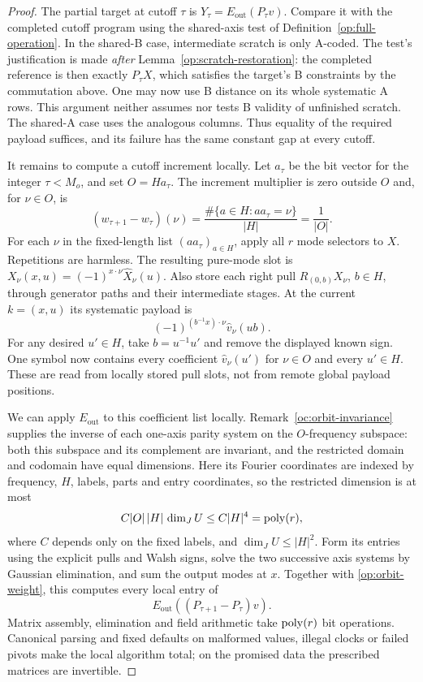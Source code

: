 \begin{proof}
The partial target at cutoff $\tau$ is
$Y_\tau=E_{\mathrm{out}}(P_\tau v)$.
Compare it with the completed cutoff program using the shared-axis
test of Definition~\ref{op:full-operation}.  In the shared-B case,
intermediate scratch is only A-coded.  The test's justification is
made \emph{after} Lemma~\ref{op:scratch-restoration}: the completed
reference is then exactly $P_\tau X$, which satisfies the target's
B constraints by the commutation above.  One may now use B distance
on its whole systematic A rows.  This argument neither assumes nor
tests B validity of unfinished scratch.  The shared-A case uses the
analogous columns.  Thus equality of the required payload suffices,
and its failure has the same constant gap at every cutoff.

It remains to compute a cutoff increment locally.  Let $a_\tau$ be
the bit vector for the integer $\tau<M_o$, and set $O=Ha_\tau$.
The increment multiplier is zero outside $O$ and, for $\nu\in O$, is
\begin{equation}\label{op:orbit-weight}
 (w_{\tau+1}-w_\tau)(\nu)
 =\frac{\#\{a\in H:aa_\tau=\nu\}}{|H|}
 =\frac1{|O|}.
\end{equation}
For each $\nu$ in the fixed-length list $(aa_\tau)_{a\in H}$,
apply all $r$ mode selectors to $X$.  Repetitions are harmless.
The resulting pure-mode slot is
$X_\nu(x,u)=(-1)^{x\cdot\nu}\widehat X_\nu(u)$.
Also store each right pull $R_{(0,b)}X_\nu$, $b\in H$, through
generator paths and their intermediate stages.  At the current
$k=(x,u)$ its systematic payload is
\begin{equation}\label{op:orbit-focus}
             (-1)^{(b^{-1}x)\cdot\nu}\widehat v_\nu(ub).
\end{equation}
For any desired $u'\in H$, take $b=u^{-1}u'$ and remove the displayed
known sign.  One symbol now contains every coefficient
$\widehat v_\nu(u')$ for $\nu\in O$ and every $u'\in H$.
These are read from locally stored pull slots, not from remote global
payload positions.

We can apply $E_{\mathrm{out}}$ to this coefficient list locally.
Remark~\ref{oc:orbit-invariance} supplies the inverse of each one-axis
parity system on the $O$-frequency subspace: both this subspace and its
complement are invariant, and the restricted domain and codomain have
equal dimensions. Here its Fourier coordinates are indexed by frequency,
$H$, labels, parts and entry coordinates, so the restricted dimension is
at most
\begin{equation}\label{op:orbit-dimension}
         C|O|\,|H|\,\dim_J U\le C|H|^4=\operatorname{poly}(r),
\end{equation}
where $C$ depends only on the fixed labels, and
$\dim_JU\le |H|^2$.  Form its entries using the explicit pulls and
Walsh signs, solve the two successive axis systems by Gaussian
elimination, and sum the output modes at $x$.  Together with
\eqref{op:orbit-weight}, this computes every local entry of
\[
                 E_{\mathrm{out}}((P_{\tau+1}-P_\tau)v).
\]
Matrix assembly, elimination and field arithmetic take $\operatorname{poly}(r)$
bit operations.  Canonical parsing and fixed defaults on malformed
values, illegal clocks or failed pivots make the local algorithm total;
on the promised data the prescribed matrices are invertible.


\end{proof}
